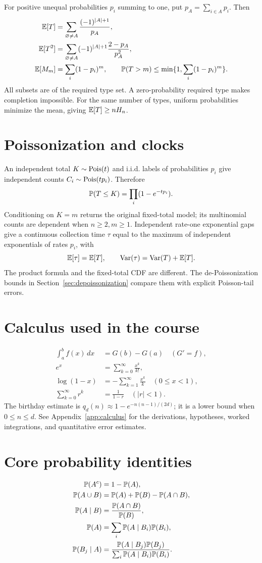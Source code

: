 For positive unequal probabilities $p_i$ summing to one, put
$p_A=\sum_{i\in A}p_i$. Then
\begin{align*}
\E[T]&=\sum_{\varnothing\ne A}\frac{(-1)^{|A|+1}}{p_A},\\
\E[T^2]&=\sum_{\varnothing\ne A}(-1)^{|A|+1}\frac{2-p_A}{p_A^2},\\
\E[M_m]&=\sum_i(1-p_i)^m,\qquad
\P(T>m)\le\min\{1,\sum_i(1-p_i)^m\}.
\end{align*}
All subsets are of the required type set. A zero-probability required
type makes completion impossible. For the same number of types, uniform
probabilities minimize the mean, giving $\E[T]\ge nH_n$.

\section*{Poissonization and clocks}
An independent total $K\sim\Pois(t)$ and i.i.d. labels of probabilities
$p_i$ give independent counts $C_i\sim\Pois(tp_i)$. Therefore
\[
\P(T\le K)=\prod_i(1-e^{-tp_i}).
\]
Conditioning on $K=m$ returns the original fixed-total model; its
multinomial counts are dependent when $n\ge2,m\ge1$.
Independent rate-one exponential gaps give
a continuous collection time $\tau$ equal to the maximum of independent
exponentials of rates $p_i$, with
\[
\E[\tau]=\E[T],\qquad \Var(\tau)=\Var(T)+\E[T].
\]
The product formula and the fixed-total CDF are different. The
de-Poissonization bounds in Section~\ref{sec:depoissonization} compare
them with explicit Poisson-tail errors.

\section*{Calculus used in the course}
\begin{align*}
 \int_a^b f(x)\,dx&=G(b)-G(a)\quad(G'=f),\\
 e^x&=\sum_{k=0}^{\infty}\frac{x^k}{k!},\\
 \log(1-x)&=-\sum_{k=1}^{\infty}\frac{x^k}{k}\quad(0\le x<1),\\
 \sum_{k=0}^{\infty}r^k&=\frac1{1-r}\quad(|r|<1).
\end{align*}
The birthday estimate is $q_d(n)\approx1-e^{-n(n-1)/(2d)}$;
it is a lower bound when $0\le n\le d$.
See Appendix~\ref{app:calculus} for the derivations, hypotheses,
worked integrations, and quantitative error estimates.

\section*{Core probability identities}
\begin{align*}
\P(A^c)&=1-\P(A),\\
\P(A\cup B)&=\P(A)+\P(B)-\P(A\cap B),\\
\P(A\mid B)&=\frac{\P(A\cap B)}{\P(B)},\\
\P(A)&=\sum_i\P(A\mid B_i)\P(B_i),\\
\P(B_j\mid A)&=\frac{\P(A\mid B_j)\P(B_j)}{\sum_i\P(A\mid B_i)\P(B_i)}.
\end{align*}

